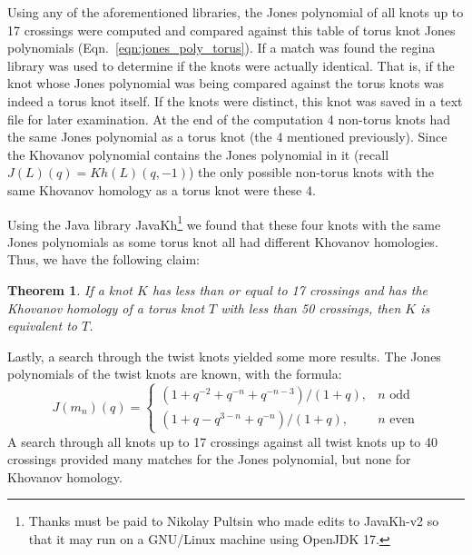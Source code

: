 \documentclass{article}
\theoremstyle{plain}
\newtheorem{theorem}{Theorem}
\begin{document}
        Using any of the aforementioned libraries, the Jones polynomial of all
        knots up to 17 crossings were computed and compared against this table
        of torus knot Jones polynomials (Eqn.~\ref{eqn:jones_poly_torus}).
        If a match was found the regina library was used to determine if the
        knots were actually identical. That is, if the knot whose Jones
        polynomial was being compared against the torus knots was indeed a
        torus knot itself. If the knots were distinct, this knot was saved in a
        text file for later examination. At the end of the computation 4
        non-torus knots had the same Jones polynomial as a torus knot
        (the 4 mentioned previously).
        Since the Khovanov polynomial contains the Jones polynomial in it
        (recall $J(L)(q)=Kh(L)(q,-1)$) the only possible non-torus knots with
        the same Khovanov homology as a torus knot were these 4.
        \par\hfill\par
        Using the Java library JavaKh\footnote{%
            Thanks must be paid to Nikolay Pultsin who made edits to
            JavaKh-v2 so that it may run on a GNU/Linux machine using
            OpenJDK 17.
        }
        we found that these four knots with the same Jones polynomials as some
        torus knot all had different Khovanov homologies. Thus, we have the
        following claim:
        \begin{theorem}
            If a knot $K$ has less than or equal to 17 crossings and has the
            Khovanov homology of a torus knot $T$ with less than 50 crossings,
            then $K$ is equivalent to $T$.
        \end{theorem}
        Lastly, a search through the twist knots yielded some more results.
        The Jones polynomials of the twist knots are known, with the formula:
        \begin{equation}
            J(m_{n})(q)=
            \begin{cases}
                (1+q^{-2}+q^{-n}+q^{-n-3})/(1+q),&n\textrm{ odd}\\
                (1+q-q^{3-n}+q^{-n})/(1+q),&n\textrm{ even}
            \end{cases}
        \end{equation}
        A search through all knots up to 17 crossings against all twist knots
        up to 40 crossings provided many matches for the Jones polynomial, but
        none for Khovanov homology.
        \par\hfill\par
\end{document}
